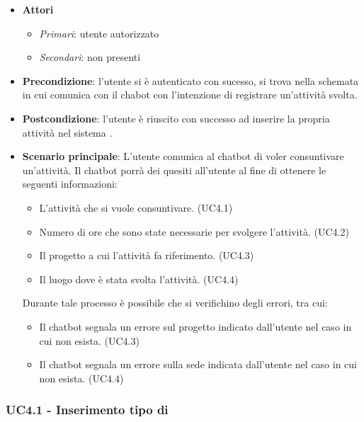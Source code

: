 \begin{itemize}
    \item \textbf{Attori}
    \begin{itemize} 
        \item \textit{Primari}: utente autorizzato
        \item \textit{Secondari}: non presenti
    \end{itemize}
 \item \textbf{Precondizione}: l'utente si è autenticato con sucesso, si trova nella schemata in cui comunica con il chabot con l'intenzione di registrare un'attività svolta. 
 \item \textbf{Postcondizione}: l'utente è riuscito con successo ad inserire la propria attività nel sistema .  
 \item \textbf{Scenario principale}: L'utente comunica al chatbot di voler consuntivare un'attività. Il chatbot porrà dei quesiti all'utente al fine di ottenere le seguenti informazioni: 
    \begin{itemize}
        \item L'attività che si vuole consuntivare. (UC4.1)
        \item Numero di ore che sono state necessarie per svolgere l'attività. (UC4.2)
        \item Il progetto a cui l'attività fa riferimento. (UC4.3)
        \item Il luogo dove è stata svolta l'attività. (UC4.4)
    \end{itemize}
\newpage
 Durante tale processo è possibile che si verifichino degli errori, tra cui: 
    \begin{itemize}
        \item Il chatbot segnala un errore sul progetto indicato dall'utente nel caso in cui non esista. (UC4.3)
        \item Il chatbot segnala un errore sulla sede indicata dall'utente nel caso in cui non esista. (UC4.4)
    \end{itemize}
\end{itemize}

\subsubsection{UC4.1 - Inserimento tipo di }

